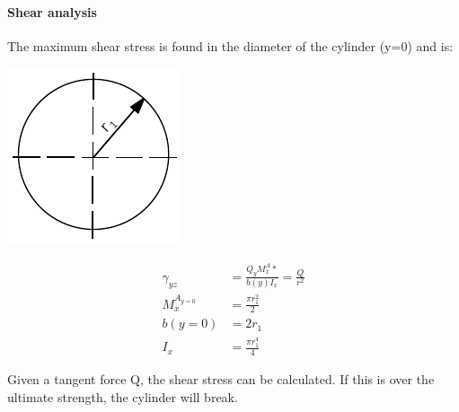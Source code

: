 \vfill
  \paragraph{Shear analysis} %
  \label{ssub:shear_analysis}
  The maximum shear stress is found in the diameter of the cylinder (y=0) and is:
  
  \noindent\begin{minipage}{0.2\textwidth}%
  \includegraphics[width=\linewidth]{figures/profile_tube.pdf}
  \end{minipage}%
  \hfill%
  \begin{minipage}{0.8\textwidth}
    \begin{equation}
    \begin{aligned}
      \gamma_{yz} &= \frac{Q_y M_{x}^A*}{b(y) I_x} = \frac{Q}{r^2}\\
      M_{x}^{A_{y=0}} &= \frac{\pi r_1^2}{2} \\
      b(y=0) &= 2 r_1 \\
      I_x &= \frac{\pi r_1^4}{4}
      \end{aligned}
    \end{equation}
  \end{minipage}
  Given a tangent force Q, the shear stress can be calculated.
  If this is over the ultimate strength, the cylinder will break.


